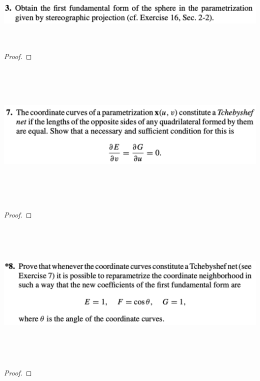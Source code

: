\documentclass{report}
\begin{document}
\begin{question}{}{}
\includegraphics[height=3cm,width=18cm]{hw4q9}
\end{question}
\begin{proof}

\end{proof}
\begin{question}{}{}
\includegraphics[height=7cm,width=18cm]{hw4q10}
\end{question}
\begin{proof}

\end{proof}
\begin{question}{}{}
\includegraphics[height=7cm,width=18cm]{hw4q11}
\end{question}
\begin{proof}

\end{proof}
\end{document}
